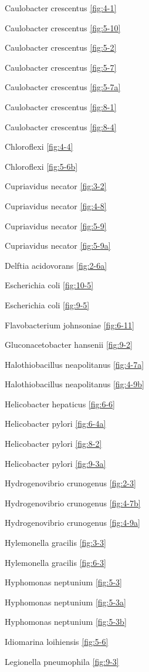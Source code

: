\documentclass[]{tufte-book}
\begin{document}
Caulobacter crescentus \ref{fig:4-1}

Caulobacter crescentus \ref{fig:5-10}

Caulobacter crescentus \ref{fig:5-2}

Caulobacter crescentus \ref{fig:5-7}

Caulobacter crescentus \ref{fig:5-7a}

Caulobacter crescentus \ref{fig:8-1}

Caulobacter crescentus \ref{fig:8-4}

Chloroflexi \ref{fig:4-4}

Chloroflexi \ref{fig:5-6b}

Cupriavidus necator \ref{fig:3-2}

Cupriavidus necator \ref{fig:4-8}

Cupriavidus necator \ref{fig:5-9}

Cupriavidus necator \ref{fig:5-9a}

Delftia acidovorans \ref{fig:2-6a}

Escherichia coli \ref{fig:10-5}

Escherichia coli \ref{fig:9-5}

Flavobacterium johnsoniae \ref{fig:6-11}

Gluconacetobacter hansenii \ref{fig:9-2}

Halothiobacillus neapolitanus \ref{fig:4-7a}

Halothiobacillus neapolitanus \ref{fig:4-9b}

Helicobacter hepaticus \ref{fig:6-6}

Helicobacter pylori \ref{fig:6-4a}

Helicobacter pylori \ref{fig:8-2}

Helicobacter pylori \ref{fig:9-3a}

Hydrogenovibrio crunogenus \ref{fig:2-3}

Hydrogenovibrio crunogenus \ref{fig:4-7b}

Hydrogenovibrio crunogenus \ref{fig:4-9a}

Hylemonella gracilis \ref{fig:3-3}

Hylemonella gracilis \ref{fig:6-3}

Hyphomonas neptunium \ref{fig:5-3}

Hyphomonas neptunium \ref{fig:5-3a}

Hyphomonas neptunium \ref{fig:5-3b}

Idiomarina loihiensis \ref{fig:5-6}

Legionella pneumophila \ref{fig:9-3}
\end{document}
